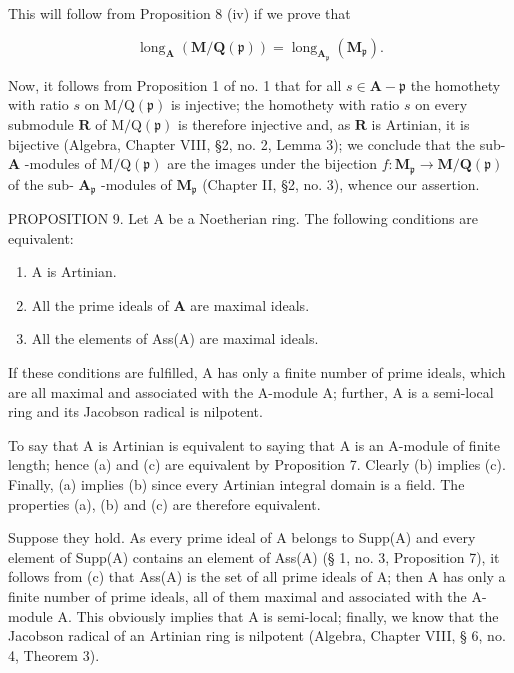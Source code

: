 This will follow from Proposition 8 (iv) if we prove that

\[
\operatorname{long} _ {\mathbf {A}} (\mathbf {M} / \mathbf {Q} (\mathfrak {p})) = \operatorname{long} _ {\mathbf {A} _ {\mathfrak {p}}} (\mathbf {M} _ {\mathfrak {p}}).
\]

Now, it follows from Proposition 1 of no. 1 that for all \(s \in \mathbf{A} - \mathfrak{p}\) the homothety with ratio \(s\) on \(\mathrm{M} / \mathrm{Q}(\mathfrak{p})\) is injective; the homothety with ratio \(s\) on every submodule \(\mathbf{R}\) of \(\mathrm{M} / \mathrm{Q}(\mathfrak{p})\) is therefore injective and, as \(\mathbf{R}\) is Artinian, it is bijective (Algebra, Chapter VIII, §2, no. 2, Lemma 3); we conclude that the sub- \(\mathbf{A}\) -modules of \(\mathrm{M} / \mathrm{Q}(\mathfrak{p})\) are the images under the bijection \(f: \mathbf{M}_{\mathfrak{p}} \to \mathbf{M} / \mathbf{Q}(\mathfrak{p})\) of the sub- \(\mathbf{A}_{\mathfrak{p}}\) -modules of \(\mathbf{M}_{\mathfrak{p}}\) (Chapter II, §2, no. 3), whence our assertion.

PROPOSITION 9. Let A be a Noetherian ring. The following conditions are equivalent:

\begin{enumerate}
\def\labelenumi{(\alph{enumi})}
\item
  A is Artinian.
\item
  All the prime ideals of \(\mathbf{A}\) are maximal ideals.
\item
  All the elements of Ass(A) are maximal ideals.
\end{enumerate}

If these conditions are fulfilled, A has only a finite number of prime ideals, which are all maximal and associated with the A-module A; further, A is a semi-local ring and its Jacobson radical is nilpotent.

To say that A is Artinian is equivalent to saying that A is an A-module of finite length; hence (a) and (c) are equivalent by Proposition 7. Clearly (b) implies (c). Finally, (a) implies (b) since every Artinian integral domain is a field. The properties (a), (b) and (c) are therefore equivalent.

Suppose they hold. As every prime ideal of A belongs to Supp(A) and every element of Supp(A) contains an element of Ass(A) (§ 1, no. 3, Proposition 7), it follows from (c) that Ass(A) is the set of all prime ideals of A; then A has only a finite number of prime ideals, all of them maximal and associated with the A-module A. This obviously implies that A is semi-local; finally, we know that the Jacobson radical of an Artinian ring is nilpotent (Algebra, Chapter VIII, § 6, no. 4, Theorem 3).

